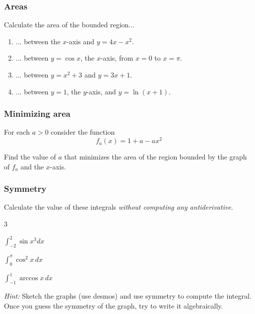 \begin{frame}[t]
	\frametitle{Areas}

	Calculate the area of the bounded region...
	\vspace{.2cm}
	\begin{enumerate}
		\item ... between the $x$-axis and $\displaystyle y=4x-x^{2}$.
			\vspace{.2cm}

		\item ... between $y=\cos x$, the $x$-axis, from $x=0$ to $x=\pi$.
			\vspace{.2cm}

		\item ... between $\displaystyle y=x^{2}+3$ and $\displaystyle y=3x+1$.
			\vspace{.2cm}

		\item ... between $y=1$, the $y$-axis, and $y=\ln(x+1)$.
	\end{enumerate}
\end{frame}

\begin{frame}[t]
	\frametitle{Minimizing area}

	For each $a >0$ consider the function
	\[
		f_{a}(x) = 1 + a -ax^{2}
	\]

	Find the value of $a$ that minimizes the area of the region bounded by the graph
	of $f_{a}$ and the $x$-axis. \hfill
	\href{https://www.desmos.com/calculator/x7vkfcerdp}{}
\end{frame}

\begin{frame}[t]
	\frametitle{Symmetry}

	Calculate the value of these integrals \emph{without computing any
	antiderivative}.

	\begin{enumerate}
	\end{enumerate}

	\emph{Hint:} Sketch the graphs (use desmos) and use symmetry to compute the integral.
	\\ Once you guess the symmetry of the graph, try to write it algebraically.
	\hfill
	\href{https://www.desmos.com/calculator/ncysdsu3yv}{}
	\href{https://www.desmos.com/calculator/fwjs5zoury}{}
	\href{https://www.desmos.com/calculator/tjakgza6vf}{}
\end{frame}

